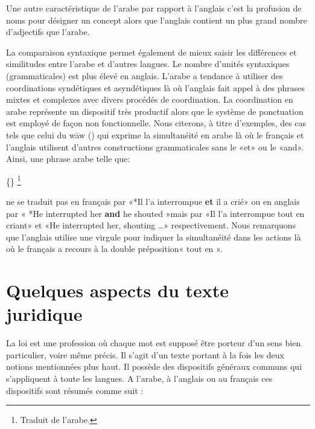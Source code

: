 \documentclass[french]{textolivre}
\begin{document}
Une autre caractéristique de l’arabe par rapport à l’anglais c’est la profusion de noms pour désigner un concept alors que l’anglais contient un plus grand nombre d'adjectifs que l’arabe.

La comparaison syntaxique permet également de mieux saisir les différences et similitudes entre l’arabe et d’autres langues. Le nombre d’unités syntaxiques (grammaticales) est plus élevé en anglais. L’arabe a tendance à utiliser des coordinations syndétiques et asyndétiques là où l’anglais fait appel à des phrases mixtes et complexes avec divers procédés de coordination. La coordination en arabe représente un dispositif très productif alors que le système de ponctuation est employé de façon non fonctionnelle. Nous citerons, à titre d’exemples, des cas tels que celui du wāw () qui exprime la simultanéité en arabe là où le français et l’anglais utilisent d’autres constructions grammaticales sans le «et» ou le «and». Ainsi, une phrase arabe telle que: 

\{\} 
\cite[p. 236]{al-manfaluti1952}\footnote{Traduit de l’arabe.}

ne se traduit pas en français par «*Il l’a interrompue \textbf{et} il a crié» ou en anglais par « *He interrupted her \textbf{and} he shouted »mais par «Il l’a interrompue tout en criant» et «He interrupted her, shouting …» respectivement. Nous remarquons que l’anglais utilise une virgule pour indiquer la simultanéité dans les actions là où le français a recours à la double préposition« tout en ».

\section{Quelques aspects du texte juridique}
La loi est une profession où chaque mot est supposé être porteur d’un sens bien particulier, voire même précis. Il s’agit d’un texte portant à la fois les deux notions mentionnées plus haut.  Il possède des dispositifs généraux communs qui s'appliquent à toute les langues. A l’arabe, à l’anglais ou au français ces dispositifs sont résumés comme suit : 
\end{document}
